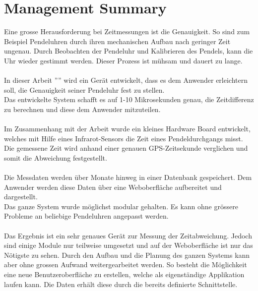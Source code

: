 \section{Management Summary}
Eine grosse Herausforderung bei Zeitmessungen ist die Genauigkeit. So sind zum Beispiel Pendeluhren durch ihren mechanischen Aufbau nach geringer Zeit ungenau. Durch Beobachten der Pendeluhr und Kalibrieren des Pendels, kann die Uhr wieder gestimmt werden. Dieser Prozess ist mühsam und dauert zu lange.\\
\\
In dieser Arbeit ''\documenttitle'' wird ein Gerät entwickelt, dass es dem Anwender erleichtern soll, die Genauigkeit seiner Pendeluhr fest zu stellen.\\
Das entwickelte System schafft es auf 1-10 Mikrosekunden genau, die Zeitdifferenz zu berechnen und diese dem Anwender mitzuteilen.\\
\\
Im Zusammenhang mit der Arbeit wurde ein kleines Hardware Board entwickelt, welches mit Hilfe eines Infrarot-Sensors die Zeit eines Pendeldurchgangs misst.\\
Die gemessene Zeit wird anhand einer genauen GPS-Zeitsekunde verglichen und somit die Abweichung festgestellt.\\
\\
Die Messdaten werden über Monate hinweg in einer Datenbank gespeichert.
Dem Anwender werden diese Daten über eine Weboberfläche aufbereitet und dargestellt.\\
Das ganze System wurde möglichst modular gehalten. Es kann ohne grössere Probleme an beliebige Pendeluhren angepasst werden.\\
\\
Das Ergebnis ist ein sehr genaues Gerät zur Messung der Zeitabweichung. 
Jedoch sind einige Module nur teilweise umgesetzt und auf der Weboberfläche ist nur das Nötigste zu sehen. 
Durch den Aufbau und die Planung des ganzen Systems kann aber ohne grossen Aufwand weitergearbeitet werden. 
So besteht die Möglichkeit eine neue Benutzeroberfläche zu erstellen, welche als eigenständige Applikation laufen kann. Die Daten erhält diese durch die bereits definierte Schnittstelle.

